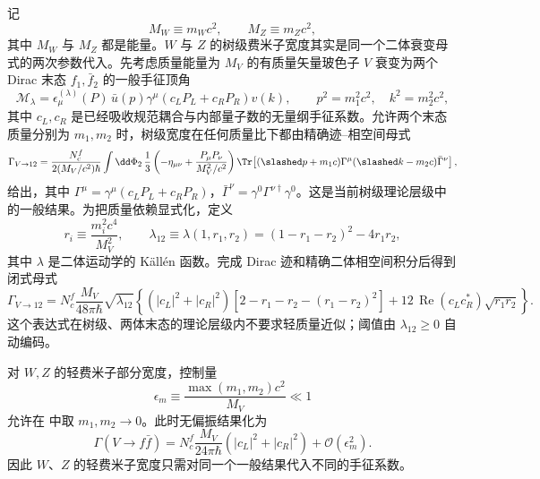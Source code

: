 记
\begin{equation*}
M_W\equiv m_Wc^2,\qquad M_Z\equiv m_Zc^2,
\end{equation*}
其中 $M_W$ 与 $M_Z$ 都是能量。$W$ 与 $Z$ 的树级费米子宽度其实是同一个二体衰变母式的两次参数代入。先考虑质量能量为 $M_V$ 的有质量矢量玻色子 $V$ 衰变为两个 Dirac 末态 $f_1,\bar f_2$ 的一般手征顶角
\begin{equation}
 \mathcal M_\lambda
 =\epsilon_\mu^{(\lambda)}(P)\,
 \bar u(p)\gamma^\mu\!
 \left(c_LP_L+c_RP_R\right)v(k),
 \qquad p^2=m_1^2c^2,\quad k^2=m_2^2c^2,
 \label{eq:generic-vector-ff-amplitude-dp91}
\end{equation}
其中 $c_L,c_R$ 是已经吸收规范耦合与内部量子数的无量纲手征系数。允许两个末态质量分别为 $m_1,m_2$ 时，树级宽度在任何质量比下都由精确迹--相空间母式
\begin{equation}
 {
 \Gamma_{V\to12}
 =\frac{N_c^f}{2(M_V/c^2)\hbar}
 \int\dd\Phi_2\,
 \frac13\left(-\eta_{\mu\nu}+\frac{P_\mu P_\nu}{M_V^2/c^2}\right)
 \Tr\!\left[(\slashed p+m_1c)\Gamma^\mu
 (\slashed k-m_2c)\bar\Gamma^\nu\right],}
 \label{eq:generic-vector-ff-exact-width-dp92}
\end{equation}
给出，其中 $\Gamma^\mu=\gamma^\mu(c_LP_L+c_RP_R)$，$\bar\Gamma^\nu=\gamma^0\Gamma^{\nu\dagger}\gamma^0$。这是当前树级理论层级中的一般结果。为把质量依赖显式化，定义
\begin{equation*}
 r_i\equiv\frac{m_i^2c^4}{M_V^2},\qquad
 \lambda_{12}\equiv\lambda(1,r_1,r_2)
 =(1-r_1-r_2)^2-4r_1r_2,
\end{equation*}
其中 $\lambda$ 是二体运动学的 Källén 函数。完成 Dirac 迹和精确二体相空间积分后得到闭式母式
\begin{equation}
 {
 \Gamma_{V\to12}
 =N_c^f\frac{M_V}{48\pi\hbar}\sqrt{\lambda_{12}}
 \left\{
 (|c_L|^2+|c_R|^2)
 \left[2-r_1-r_2-(r_1-r_2)^2\right]
 +12\,\operatorname{Re}(c_Lc_R^*)\sqrt{r_1r_2}
 \right\}.}
 \label{eq:generic-vector-ff-exact-closed-dp92}
\end{equation}
这个表达式在树级、两体末态的理论层级内不要求轻质量近似；阈值由 $\lambda_{12}\ge0$ 自动编码。

对 $W,Z$ 的轻费米子部分宽度，控制量
\begin{equation*}
 \epsilon_m\equiv\frac{\max(m_1,m_2)c^2}{M_V}\ll1
\end{equation*}
允许在 中取 $m_1,m_2\to0$。此时无偏振结果化为
\begin{equation}
 {
 \Gamma(V\to f\bar f)
 =N_c^f\frac{M_V}{24\pi\hbar}
 \left(|c_L|^2+|c_R|^2\right)
 +\mathcal O(\epsilon_m^2).}
 \label{eq:generic-vector-ff-width-dp91}
\end{equation}
因此 $W$、$Z$ 的轻费米子宽度只需对同一个一般结果代入不同的手征系数。

